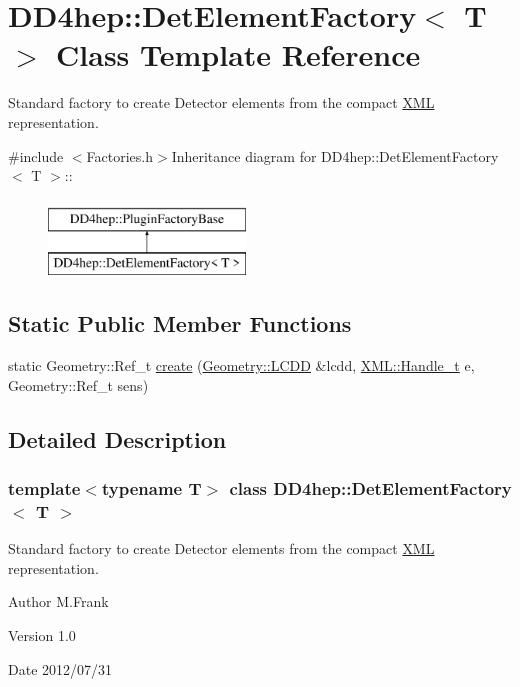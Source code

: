 \hypertarget{class_d_d4hep_1_1_det_element_factory}{
\section{DD4hep::DetElementFactory$<$ T $>$ Class Template Reference}
\label{class_d_d4hep_1_1_det_element_factory}
}


Standard factory to create Detector elements from the compact \hyperlink{namespace_d_d4hep_1_1_x_m_l}{XML} representation.  


{\ttfamily \#include $<$Factories.h$>$}Inheritance diagram for DD4hep::DetElementFactory$<$ T $>$::\begin{figure}[H]
\begin{center}
\leavevmode
\includegraphics[height=2cm]{class_d_d4hep_1_1_det_element_factory}
\end{center}
\end{figure}
\subsection*{Static Public Member Functions}
\begin{DoxyCompactItemize}
\item 
static Geometry::Ref\_\-t \hyperlink{class_d_d4hep_1_1_det_element_factory_aaf2f69411f75e9d157627298c3c5fb95}{create} (\hyperlink{class_d_d4hep_1_1_geometry_1_1_l_c_d_d}{Geometry::LCDD} \&lcdd, \hyperlink{class_d_d4hep_1_1_x_m_l_1_1_handle__t}{XML::Handle\_\-t} e, Geometry::Ref\_\-t sens)
\end{DoxyCompactItemize}


\subsection{Detailed Description}
\subsubsection*{template$<$typename T$>$ class DD4hep::DetElementFactory$<$ T $>$}

Standard factory to create Detector elements from the compact \hyperlink{namespace_d_d4hep_1_1_x_m_l}{XML} representation. \begin{DoxyAuthor}{Author}
M.Frank 
\end{DoxyAuthor}
\begin{DoxyVersion}{Version}
1.0 
\end{DoxyVersion}
\begin{DoxyDate}{Date}
2012/07/31 
\end{DoxyDate}


